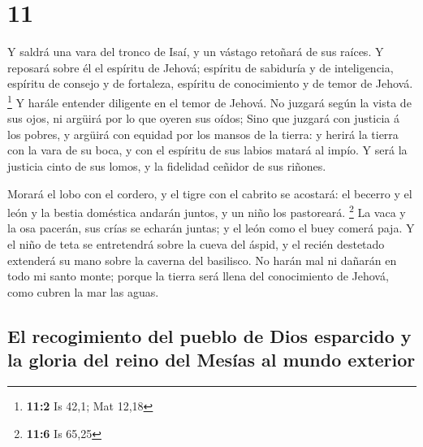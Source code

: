 \hypertarget{section-10}{%
\section{11}\label{section-10}}

 Y saldrá una vara del tronco de Isaí, y un vástago
retoñará de sus raíces.  Y reposará sobre él el espíritu
de Jehová; espíritu de sabiduría y de inteligencia, espíritu de consejo
y de fortaleza, espíritu de conocimiento y de temor de Jehová.
\footnote{\textbf{11:2} Is 42,1; Mat 12,18}  Y harále
entender diligente en el temor de Jehová. No juzgará según la vista de
sus ojos, ni argüirá por lo que oyeren sus oídos;  Sino
que juzgará con justicia á los pobres, y argüirá con equidad por los
mansos de la tierra: y herirá la tierra con la vara de su boca, y con el
espíritu de sus labios matará al impío.  Y será la
justicia cinto de sus lomos, y la fidelidad ceñidor de sus riñones.

 Morará el lobo con el cordero, y el tigre con el cabrito
se acostará: el becerro y el león y la bestia doméstica andarán juntos,
y un niño los pastoreará. \footnote{\textbf{11:6} Is 65,25}
 La vaca y la osa pacerán, sus crías se echarán juntas; y
el león como el buey comerá paja.  Y el niño de teta se
entretendrá sobre la cueva del áspid, y el recién destetado extenderá su
mano sobre la caverna del basilisco.  No harán mal ni
dañarán en todo mi santo monte; porque la tierra será llena del
conocimiento de Jehová, como cubren la mar las aguas.

\hypertarget{el-recogimiento-del-pueblo-de-dios-esparcido-y-la-gloria-del-reino-del-mesuxedas-al-mundo-exterior}{%
\subsection{El recogimiento del pueblo de Dios esparcido y la gloria del
reino del Mesías al mundo
exterior}\label{el-recogimiento-del-pueblo-de-dios-esparcido-y-la-gloria-del-reino-del-mesuxedas-al-mundo-exterior}}

